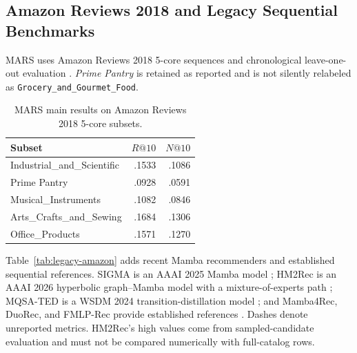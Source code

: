 \subsection{Amazon Reviews 2018 and Legacy Sequential Benchmarks}

MARS uses Amazon Reviews 2018 5-core sequences and chronological leave-one-out
evaluation \cite{MARS}. \emph{Prime Pantry} is retained as reported and is not
silently relabeled as \texttt{Grocery\_and\_Gourmet\_Food}.

\begin{table}[H]
\centering
\caption{MARS main results on Amazon Reviews 2018 5-core subsets.}
\label{tab:mars-amazon18}
\begin{tabular}{@{}lrr@{}}
\toprule
Subset & $R@10$ & $N@10$ \\
\midrule
Industrial\_and\_Scientific & .1533 & .1086 \\
Prime Pantry & .0928 & .0591 \\
Musical\_Instruments & .1082 & .0846 \\
Arts\_Crafts\_and\_Sewing & .1684 & .1306 \\
Office\_Products & .1571 & .1270 \\
\bottomrule
\end{tabular}
\end{table}

Table~\ref{tab:legacy-amazon} adds recent Mamba recommenders and established
sequential references. SIGMA is an AAAI 2025 Mamba model \cite{SIGMA}; HM2Rec
is an AAAI 2026 hyperbolic graph--Mamba model with a mixture-of-experts path
\cite{HM2REC}; MQSA-TED is a WSDM 2024 transition-distillation model
\cite{MQSATED}; and Mamba4Rec, DuoRec, and FMLP-Rec provide established
references \cite{MAMBA4REC,DUOREC,FMLPREC}. Dashes denote unreported metrics.
HM2Rec's high values come from sampled-candidate evaluation and must not be
compared numerically with full-catalog rows.

